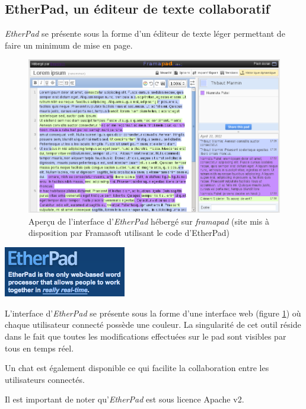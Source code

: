 \subsection{EtherPad, un éditeur de texte collaboratif}
\emph{EtherPad} se présente sous la forme d'un éditeur de texte léger permettant de faire un minimum de mise en page.

\begin{figure}[H]
	\includegraphics[width=\textwidth]{files/outils/etherpad_screenshot}	
	\caption{Aperçu de l'interface d'\emph{EtherPad} hébergé sur \emph{framapad} (site mis à disposition par Framasoft utilisant le code d'EtherPad)}
	\label{etherpad_screenshot}
\end{figure}

\begin{center}
\includegraphics[width=0.4\textwidth]{files/outils/etherpad}
\end{center}

L'interface d'\emph{EtherPad} se présente sous la forme d'une interface web (figure \ref{etherpad_screenshot}) où chaque utilisateur connecté possède une couleur. La singularité de cet outil réside dans le fait que toutes les modifications effectuées sur le pad sont visibles par tous en temps réel.

Un chat est également disponible ce qui facilite la collaboration entre les utilisateurs connectés.

Il est important de noter qu'\emph{EtherPad} est sous licence \gls{Apache v2}.

